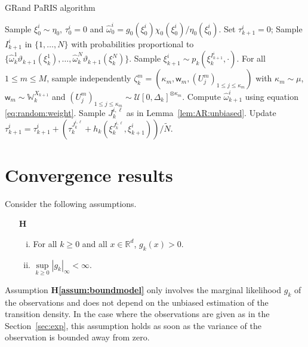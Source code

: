 \documentclass[12pt]{article}
\newcommand{\1}{\mathrm{1}}
\newcommand{\mw}{\mathsf{w}}%
\newcounter{hypA}
\newenvironment{hypA}{\refstepcounter{hypA}\begin{itemize}
\item[{\bf H\arabic{hypA}}]}{\end{itemize}}
\begin{document}
\begin{algorithm}
\caption{GRand PaRIS algorithm}
\begin{algorithmic}
\STATE Sample $\xi_0^i \sim\eta_0$, $\tau_0^i = 0$  and  $\widehat \omega_0^i = g_0(\xi_0^i)\chi_0(\xi_0^i)/\eta_0(\xi_0^i)$.
\ENDFOR
{}
\STATE Set $\tau_{k+1}^i=0$;
\STATE Sample $I_{k+1}^{i}$ in $\{1,\ldots,N\}$ with probabilities proportional to $\{\widehat{\omega}_{k}^1\vartheta_{k+1}(\xi_{k}^1),\dots,\widehat{\omega}_{k}^N\vartheta_{k+1}(\xi_{k}^N)\}$.
\STATE Sample $\xi_{k+1}^{i} \sim p_k(\xi_{k}^{I_{k+1}^{i}},\cdot)$.
\STATE For all $1\le m\le M$, sample independently $\zeta_k^m=(\kappa_m,\mw_m, (U_j^m)_{1\leq j\leq \kappa_m})$ with $\kappa_m\sim \mu$, $\mw_m\sim \mathbb{W}_k^{X_{k+1}}$ and $(U_j^m)_{1\leq j\leq \kappa_m}\sim \mathcal{U}[0,\Delta_k]^{\otimes \kappa_m}$.
\STATE Compute $\widehat{\omega}^{i}_{k+1}$ using equation \eqref{eq:random:weight}.
\STATE Sample $J_k^{i,\ell}$ as in Lemma~\ref{lem:AR:unbiased}.
\STATE Update $\tau_{k+1}^i = \tau_{k+1}^i + (\tau^{J_k^{i,\ell}}_{k} + h_k(\xi^{J_k^{i,\ell}}_{k},\xi^i_{k+1}))/\tilde{N}$.
\ENDFOR
\ENDFOR
\ENDFOR
\end{algorithmic}
\label{alg:Ozaki:PaRIS}
\end{algorithm}


\section{Convergence results}
\label{sec:convergence}
Consider the following assumptions.
\begin{hypA}
\label{assum:boundmodel}
\begin{enumerate}[(i)]
\item For all $k \geq 0$ and  all $x\in \mathbb{R}^d$, $g_{k}(x) >0$.
\item $\underset{k\geq 0}{\sup}|g_{k}|_{\infty} < \infty$.
\end{enumerate}
\end{hypA}

Assumption {\bf H\ref{assum:boundmodel}} only involves the marginal likelihood $g_k$ of the observations and does not depend on the unbiased estimation of the transition density. 
In the case where the observations are given as in the Section~\ref{sec:exp}, this assumption holds as soon as the variance of the observation is bounded away from zero. 
\end{document}
